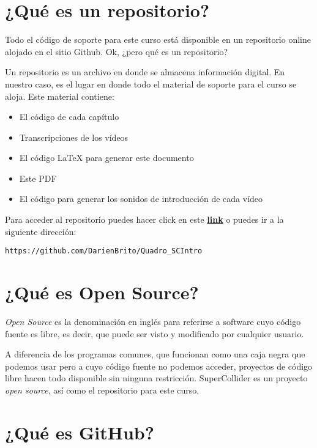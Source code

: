 \section{¿Qué es un repositorio?}

Todo el código de soporte para este curso está disponible en un repositorio online alojado en el sitio Github. Ok, ¿pero qué es un repositorio?

Un repositorio es un archivo en donde se almacena información digital. En nuestro caso, es el lugar en donde todo el material de soporte para el curso se aloja. Este material contiene:

\begin{itemize}
\item El código de cada capítulo
\item Transcripciones de los vídeos 
\item El código LaTeX para generar este documento
\item Este PDF
\item El código para generar los sonidos de introducción de cada vídeo
\end{itemize}

Para acceder al repositorio puedes hacer click en este \href{https://github.com/DarienBrito/Quadro_SCIntro} {\textbf{link}} o puedes ir a la siguiente dirección:

\small{
\begin{verbatim}
https://github.com/DarienBrito/Quadro_SCIntro
\end{verbatim}
}

\section{¿Qué es Open Source?}

\textit{Open Source} es la denominación en inglés para referirse a software cuyo código fuente es libre, es decir, que puede ser visto y modificado por cualquier usuario. 

A diferencia de los programas comunes, que funcionan como una caja negra que podemos usar pero a cuyo código fuente no podemos acceder, proyectos de código libre hacen todo disponible sin ninguna restricción. SuperCollider es un proyecto \textit{open source}, así como el repositorio para este curso.

\section{¿Qué es GitHub?}

